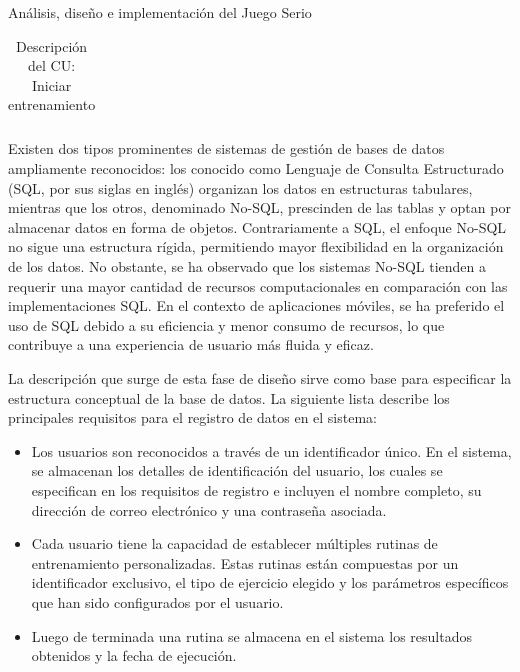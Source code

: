 \begin{thesischapter}{2} {Análisis, diseño e implementación del Juego Serio}
\begin{center}
\begin{table}
\begin{tabularx}{\textwidth}{|X|X|}
            \end{tabularx}

            \caption{Descripción del CU: Iniciar entrenamiento}
        \end{table}
    \end{center}
    
    \newpage
    Existen dos tipos prominentes de sistemas de gestión de bases de datos ampliamente reconocidos: los conocido 
    como Lenguaje de Consulta Estructurado (SQL, por sus siglas en inglés) organizan los datos en estructuras tabulares, 
    mientras que los otros, denominado No-SQL, prescinden de las tablas y optan por almacenar datos en forma de objetos. 
    Contrariamente a SQL, el enfoque No-SQL no sigue una estructura rígida, permitiendo mayor flexibilidad en la 
    organización de los datos. No obstante, se ha observado que los sistemas No-SQL tienden a requerir una mayor 
    cantidad de recursos computacionales en comparación con las implementaciones SQL. En el contexto de aplicaciones 
    móviles, se ha preferido el uso de SQL debido a su eficiencia y menor consumo de recursos, lo que contribuye a una 
    experiencia de usuario más fluida y eficaz.

    \vspace{10pt}
    La descripción que surge de esta fase de diseño sirve como base para especificar la estructura conceptual de la base de datos. 
    La siguiente lista describe los principales requisitos para el registro de datos en el sistema:
    \begin{itemize}
        \item Los usuarios son reconocidos a través de un identificador único. En el sistema, se almacenan los detalles de identificación del usuario, los cuales se especifican en los requisitos de registro e incluyen el nombre completo, su dirección de correo electrónico y una contraseña asociada.
        \item Cada usuario tiene la capacidad de establecer múltiples rutinas de entrenamiento personalizadas. Estas rutinas están compuestas por un identificador exclusivo, el tipo de ejercicio elegido y los parámetros específicos que han sido configurados por el usuario. 
        \item Luego de terminada una rutina se almacena en el sistema los resultados obtenidos y la fecha de ejecución. 
    \end{itemize}   
    

\end{thesischapter}
